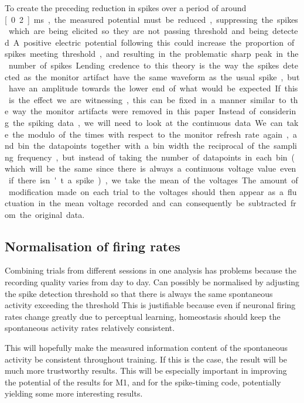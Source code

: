To create the preceding reduction in spikes over a period of around \unit[0.2]{ms}, the measured potential must be reduced, suppressing the spikes which are being elicited so they are not passing threshold and being detected.
A positive electric potential following this could increase the proportion of spikes meeting threshold, and resulting in the problematic sharp peak in the number of spikes.
Lending credence to this theory is the way the spikes detected as the monitor artifact have the same waveform as the usual spike, but have an amplitude towards the lower end of what would be expected.

If this is the effect we are witnessing, this can be fixed in a manner similar to the way the monitor artifacts were removed in this paper. Instead of considering the spiking data, we will need to look at the continuous data. We can take the modulo of the times with respect to the monitor refresh rate again, and bin the datapoints together with a bin width the reciprocal of the sampling frequency, but instead of taking the number of datapoints in each bin (which will be the same since there is always a continuous voltage value even if there isn't a spike), we take the mean of the voltages. The amount of modification made on each trial to the voltages should then appear as a fluctuation in the mean voltage recorded and can consequently be subtracted from the original data.

\subsection{Normalisation of firing rates}

Combining trials from different sessions in one analysis has problems because the recording quality varies from day to day.
Can possibly be normalised by adjusting the spike detection threshold so that there is always the same spontaneous activity exceeding the threshold
This is justifiable because even if neuronal firing rates change greatly due to perceptual learning, homeostasis should keep the spontaneous activity rates relatively consistent.

This will hopefully make the measured information content of the spontaneous activity be consistent throughout training. If this is the case, the result will be much more trustworthy results. This will be especially important in improving the potential of the results for M1, and for the spike-timing code, potentially yielding some more interesting results.

